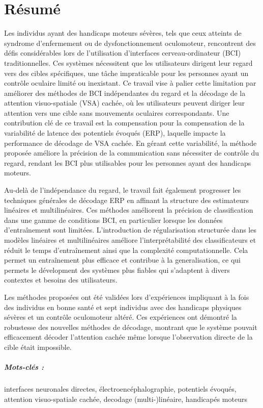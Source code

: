 \chapter*{R\'esum\'e}
Les individus ayant des handicaps moteurs sévères, tels que ceux atteints de
syndrome d'enfermement ou de dysfonctionnement oculomoteur, rencontrent des défis considérables
lors de l'utilisation d'interfaces cerveau-ordinateur (BCI)  traditionnelles.
Ces systèmes nécessitent que les utilisateurs dirigent leur regard vers des
cibles spécifiques, une tâche impraticable pour les personnes ayant un contrôle oculaire limité ou inexistant.
Ce travail vise \`a palier cette limitation par améliorer des méthodes de BCI
indépendantes du regard et la décodage de la attention visuo-spatiale (VSA) cachée, où les utilisateurs peuvent diriger leur attention vers une cible sans mouvements oculaires correspondants.
Une contribution clé de ce travail est la compensation pour la compensation de
la variabilité de latence des potentiels évoqués (ERP), laquelle impacte
la performance de décodage de VSA cachée.
En gérant cette variabilit\'e, la méthode proposée améliore la précision de la communication
sans nécessiter de contrôle du regard, rendant les BCI plus utilisables pour les personnes ayant des handicaps moteurs.

Au-delà de l'indépendance du regard, le travail fait également progresser les
techniques générales de décodage ERP en affinant la structure des estimateurs
linéaires et multilinéaires.
Ces méthodes améliorent la précision de classification dans une gamme de
conditions BCI, en particulier lorsque les données d'entraînement sont limitées.
L'introduction de régularisation structurée dans les modèles linéaires et
multilinéaires améliore l'interprétabilité des classificateurs et réduit le temps d'entraînement ainsi que la complexité computationnelle.
Cela permet un entraînement plus efficace et contribue à la generalisation, ce qui
permets le d\'evelopment des systèmes plus fiables qui s'adaptent à divers
contextes et besoins des utilisateurs.

Les méthodes proposées ont été validées lors d'expériences impliquant à la fois
des individus en bonne santé et sept individus avec des handicaps physiques sévères et un contrôle oculomoteur altéré.
Ces expériences ont démontré la robustesse des nouvelles méthodes de décodage, montrant que le système pouvait efficacement décoder l'attention cachée même lorsque l'observation directe de la cible  était impossible.

\paragraph{Mots-clés :}
interfaces neuronales directes,
\'electroenc\'ephalographie,
potentiels \'evoqu\'es,
attention visuo-spatiale cachée,
decodage (multi-)linéaire,
handicap\'es moteurs
